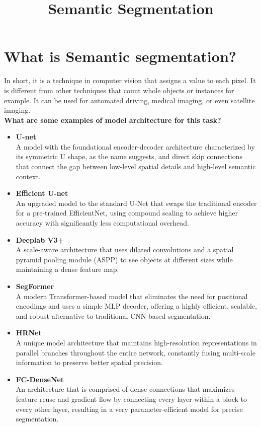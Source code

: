 \documentclass{article}
\title{Semantic Segmentation}
\begin{document}
\maketitle

\section{What is Semantic segmentation?}
In short, it is a technique in computer vision that assigns a value to each pixel. It is different from other techniques that count whole objects or instances for example. It can be used for automated driving, medical imaging, or even satellite imaging.
\\

\textbf{What are some examples of model architecture for this task?}

\begin{itemize}[label=\raisebox{0.25ex}{\tiny$\blacksquare$}, itemsep=1em]
    \item \textbf{U-net} \\
    A model with the foundational encoder-decoder architecture characterized by its symmetric U shape, as the name suggests, and direct skip connections that connect the gap between low-level spatial details and high-level semantic context.
    
    \item \textbf{Efficient U-net} \\
    An upgraded model to the standard U-Net that swaps the traditional encoder for a pre-trained EfficientNet, using compound scaling to achieve higher accuracy with significantly less computational overhead.
    
    \item \textbf{Deeplab V3+} \\
    A scale-aware architecture that uses dilated convolutions and a spatial pyramid pooling module (ASPP) to see objects at different sizes while maintaining a dense feature map.
    
    \item \textbf{SegFormer} \\
    A modern Transformer-based model that eliminates the need for positional encodings and uses a simple MLP decoder, offering a highly efficient, scalable, and robust alternative to traditional CNN-based segmentation.
    
    \item \textbf{HRNet} \\
    A unique model architecture that maintains high-resolution representations in parallel branches throughout the entire network, constantly fusing multi-scale information to preserve better spatial precision.
    
    \item \textbf{FC-DenseNet} \\
    An architecture that is comprised of dense connections that maximizes feature reuse and gradient flow by connecting every layer within a block to every other layer, resulting in a very parameter-efficient model for precise segmentation.
\end{itemize}
    
\end{document}
